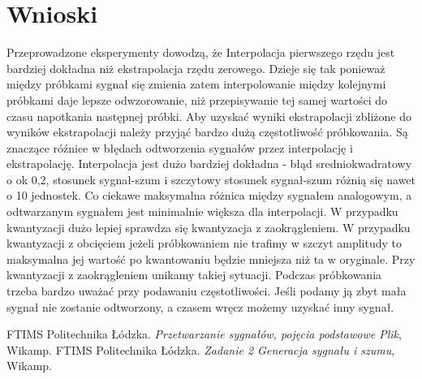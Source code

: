\documentclass[12pt]{article}
\begin{document}
\section{Wnioski}

Przeprowadzone eksperymenty dowodzą, że  Interpolacja pierwszego rzędu jest bardziej dokładna niż ekstrapolacja rzędu zerowego.  Dzieje się tak ponieważ między próbkami sygnał się zmienia zatem interpolowanie między kolejnymi próbkami daje lepsze odwzorowanie, niż przepisywanie tej samej wartości do czasu napotkania następnej próbki.
Aby uzyskać wyniki ekstrapolacji zbliżone do wyników ekstrapolacji należy przyjąć bardzo dużą częstotliwość próbkowania. Są znaczące róźnice w błędach odtworzenia sygnałów przez interpolację i ekstrapolację. Interpolacja jest dużo bardziej dokładna - błąd sredniokwadratowy o ok 0,2, stosunek sygnał-szum i szczytowy stosunek sygnał-szum różnią się nawet o 10 jednostek. Co ciekawe maksymalna różnica między sygnałem analogowym, a odtwarzanym sygnałem jest minimalnie większa dla interpolacji.
W przypadku kwantyzacji dużo lepiej sprawdza się kwantyzacja z zaokrągleniem. W przypadku kwantyzacji z obcięciem jeżeli próbkowaniem nie trafimy w szczyt amplitudy to maksymalna jej wartość po kwantowaniu będzie mniejsza niż ta w oryginale. Przy kwantyzacji z zaokrągleniem unikamy takiej sytuacji.
Podczas próbkowania trzeba bardzo uważać przy podawaniu częstotliwości. Jeśli podamy ją zbyt mała sygnał nie zostanie odtworzony, a czasem wręcz możemy uzyskać inny sygnał.
\begin{thebibliography}{0}
    FTIMS Politechnika Łódzka.
    \textsl{Przetwarzanie sygnałów, pojęcia podstawowe Plik}, Wikamp.
  FTIMS Politechnika Łódzka.
    \textsl{Zadanie 2 Generacja sygnału i szumu}, Wikamp.
\end{thebibliography}
\end{document}
